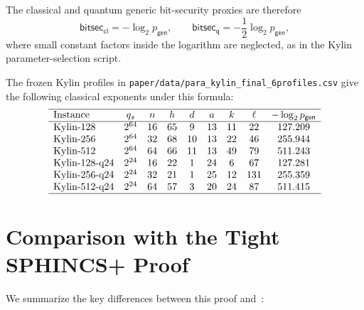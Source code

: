 \documentclass[11pt,a4paper]{article}
\begin{document}
The classical and quantum generic bit-security proxies are therefore
\[
\mathsf{bitsec}_{\mathsf{cl}}=-\log_2 p_{\mathsf{gen}},
\qquad
\mathsf{bitsec}_{\mathsf{q}}=-\frac{1}{2}\log_2 p_{\mathsf{gen}},
\]
where small constant factors inside the logarithm are neglected, as in the Kylin parameter-selection script.

The frozen Kylin profiles in \texttt{paper/data/para\_kylin\_final\_6profiles.csv} give the following classical exponents under this formula:
\[
\begin{array}{lcccccccc}
\hline
\text{Instance} & q_s & n & h & d & a & k & \ell & -\log_2 p_{\mathsf{gen}} \\
\hline
\text{Kylin-128}     & 2^{64} & 16 & 65 & 9  & 13 & 11 & 22  & 127.209 \\
\text{Kylin-256}     & 2^{64} & 32 & 68 & 10 & 13 & 22 & 46  & 255.944 \\
\text{Kylin-512}     & 2^{64} & 64 & 66 & 11 & 13 & 49 & 79  & 511.243 \\
\text{Kylin-128-q24} & 2^{24} & 16 & 22 & 1  & 24 & 6  & 67  & 127.281 \\
\text{Kylin-256-q24} & 2^{24} & 32 & 21 & 1  & 25 & 12 & 131 & 255.359 \\
\text{Kylin-512-q24} & 2^{24} & 64 & 57 & 3  & 20 & 24 & 87  & 511.415 \\
\hline
\end{array}
\]


\section{Comparison with the Tight SPHINCS+ Proof}
\label{sec:comparison}

We summarize the key differences between this proof and~\cite[Theorem~3]{HK22}:
\end{document}
